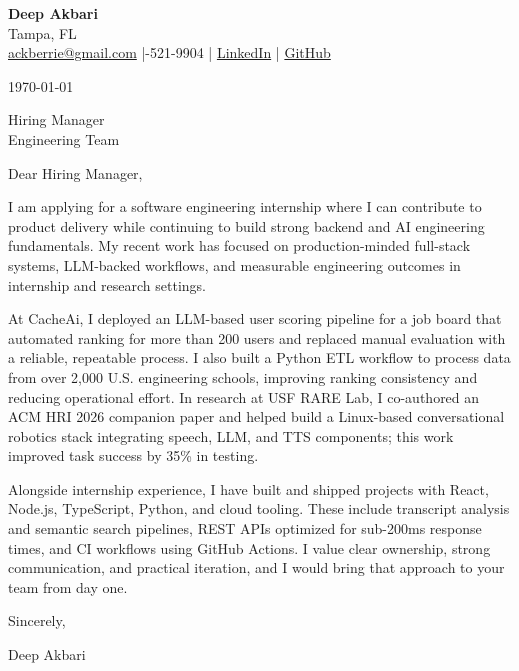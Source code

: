 \documentclass[11pt]{article}
\begin{document}
{\Large \textbf{Deep Akbari}}\\
Tampa, FL\\
\href{mailto:ackberrie@gmail.com}{ackberrie@gmail.com} \;|-521-9904 \;|\;
\href{https://www.linkedin.com/in/deep-akbari/}{LinkedIn} \;|\;
\href{https://github.com/ackberry}{GitHub}

\today

Hiring Manager\\
Engineering Team

Dear Hiring Manager,

I am applying for a software engineering internship where I can contribute to product delivery while continuing to build strong backend and AI engineering fundamentals. My recent work has focused on production-minded full-stack systems, LLM-backed workflows, and measurable engineering outcomes in internship and research settings.

At CacheAi, I deployed an LLM-based user scoring pipeline for a job board that automated ranking for more than 200 users and replaced manual evaluation with a reliable, repeatable process. I also built a Python ETL workflow to process data from over 2{,}000 U.S. engineering schools, improving ranking consistency and reducing operational effort. In research at USF RARE Lab, I co-authored an ACM HRI 2026 companion paper and helped build a Linux-based conversational robotics stack integrating speech, LLM, and TTS components; this work improved task success by 35\% in testing.

Alongside internship experience, I have built and shipped projects with React, Node.js, TypeScript, Python, and cloud tooling. These include transcript analysis and semantic search pipelines, REST APIs optimized for sub-200ms response times, and CI workflows using GitHub Actions. I value clear ownership, strong communication, and practical iteration, and I would bring that approach to your team from day one.

Sincerely,

Deep Akbari
\end{document}

